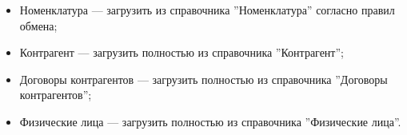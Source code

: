 \begin{itemize}
   \item Номенклатура --- загрузить из справочника ''Номенклатура'' согласно правил обмена;
  \item Контрагент --- загрузить полностью из справочника ''Контрагент'';
  \item Договоры контрагентов --- загрузить полностью из справочника ''Договоры контрагентов'';

 \item Физические лица --- загрузить полностью из справочника ''Физические лица''.
\end{itemize}




